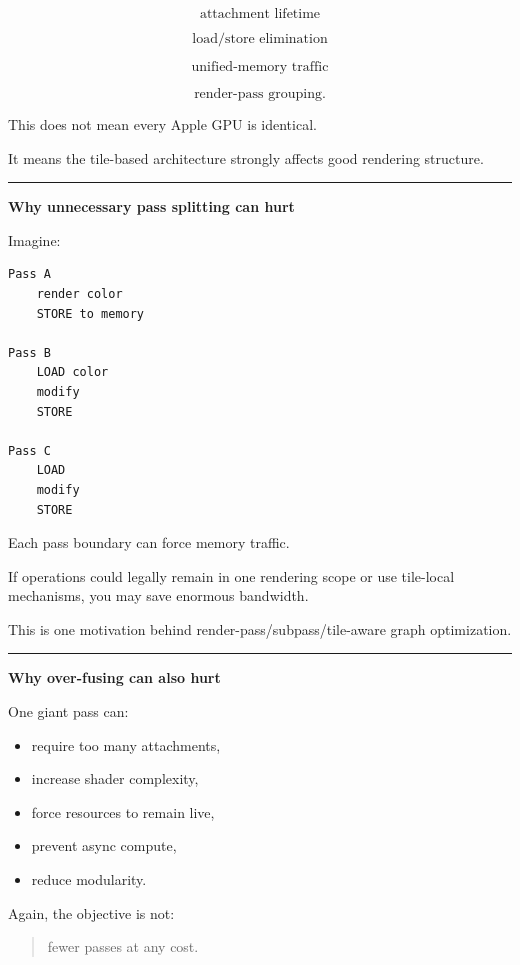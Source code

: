 \[
\boxed{
\text{attachment lifetime}
}
\]

\[
\boxed{
\text{load/store elimination}
}
\]

\[
\boxed{
\text{unified-memory traffic}
}
\]

\[
\boxed{
\text{render-pass grouping}.
}
\]

This does not mean every Apple GPU is identical.

It means the tile-based architecture strongly affects good rendering structure.

\begin{center}\rule{0.5\linewidth}{0.5pt}\end{center}

\textbf{Why unnecessary pass splitting can hurt}

Imagine:

\begin{verbatim}
Pass A
    render color
    STORE to memory

Pass B
    LOAD color
    modify
    STORE

Pass C
    LOAD
    modify
    STORE
\end{verbatim}

Each pass boundary can force memory traffic.

If operations could legally remain in one rendering scope or use tile-local mechanisms, you may save enormous bandwidth.

This is one motivation behind render-pass/subpass/tile-aware graph optimization.

\begin{center}\rule{0.5\linewidth}{0.5pt}\end{center}

\textbf{Why over-fusing can also hurt}

One giant pass can:

\begin{itemize}
\tightlist
\item
  require too many attachments,
\item
  increase shader complexity,
\item
  force resources to remain live,
\item
  prevent async compute,
\item
  reduce modularity.
\end{itemize}

Again, the objective is not:

\begin{quote}
fewer passes at any cost.
\end{quote}

